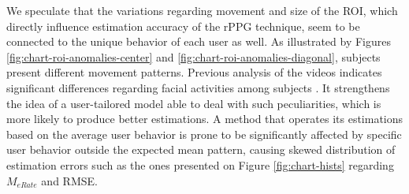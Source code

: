 We speculate that the variations regarding movement and size of the ROI, which directly influence estimation accuracy of the rPPG technique, seem to be connected to the unique behavior of each user as well. As illustrated by Figures \ref{fig:chart-roi-anomalies-center} and \ref{fig:chart-roi-anomalies-diagonal}, subjects present different movement patterns. Previous analysis of the videos indicates significant differences regarding facial activities among subjects \parencite{bevilacqua2016variations}. It strengthens the idea of a user-tailored model able to deal with such peculiarities, which is more likely to produce better estimations. A method that operates its estimations based on the average user behavior is prone to be significantly affected by specific user behavior outside the expected mean pattern, causing skewed distribution of estimation errors such as the ones presented on Figure \ref{fig:chart-hists} regarding $M_{eRate}$ and RMSE.



